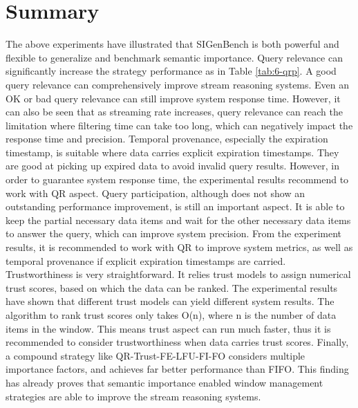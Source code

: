 \section{Summary}
The above experiments have illustrated that SIGenBench is both powerful and flexible to generalize and benchmark semantic importance. 
Query relevance can significantly increase the strategy performance as in Table \ref{tab:6-qrp}.
A good query relevance can comprehensively improve stream reasoning systems.
Even an OK or bad query relevance can still improve system response time. 
However, it can also be seen that as streaming rate increases, query relevance can reach the limitation where filtering time can take too long, which can negatively impact the response time and precision. 
Temporal provenance, especially the expiration timestamp, is suitable where data carries explicit expiration timestamps. 
They are good at picking up expired data to avoid invalid query results. 
However, in order to guarantee system response time, the experimental results recommend to work with QR aspect. 
Query participation, although does not show an outstanding performance improvement, is still an important aspect. 
It is able to keep the partial necessary data items and wait for the other necessary data items to answer the query, which can improve system precision. 
From the experiment results, it is recommended to work with QR to improve system metrics, as well as temporal provenance if explicit expiration timestamps are carried. 
Trustworthiness is very straightforward. 
It relies trust models to assign numerical trust scores, based on which the data can be ranked. 
The experimental results have shown that different trust models can yield different system results. 
The algorithm to rank trust scores only takes O(n), where n is the number of data items in the window. 
This means trust aspect can run much faster, thus it is recommended to consider trustworthiness when data carries trust scores. 
Finally, a compound strategy like QR-Trust-FE-LFU-FI-FO considers multiple importance factors, and achieves far better performance than FIFO. 
This finding has already proves that semantic importance enabled window management strategies are able to improve the stream reasoning systems. 